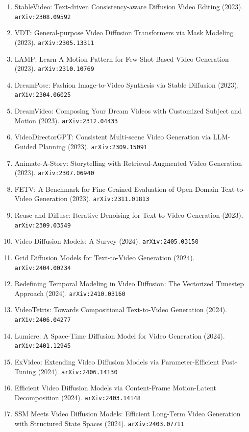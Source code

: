 \documentclass[11pt]{article}
\begin{document}
\begin{enumerate}
  Diffusion Model (2023). \texttt{arXiv:2311.16498}
  \item StableVideo: Text-driven Consistency-aware Diffusion Video Editing (2023). \texttt{arXiv:2308.09592}
  \item VDT: General-purpose Video Diffusion Transformers via Mask Modeling (2023). \texttt{arXiv:2305.13311}
  \item LAMP: Learn A Motion Pattern for Few-Shot-Based Video Generation (2023). \texttt{arXiv:2310.10769}
  \item DreamPose: Fashion Image-to-Video Synthesis via Stable Diffusion (2023). \texttt{arXiv:2304.06025}
  \item DreamVideo: Composing Your Dream Videos with Customized Subject and
  Motion (2023). \texttt{arXiv:2312.04433}
  \item VideoDirectorGPT: Consistent Multi-scene Video Generation via LLM-Guided
  Planning (2023). \texttt{arXiv:2309.15091}
  \item Animate-A-Story: Storytelling with Retrieval-Augmented Video Generation (2023). \texttt{arXiv:2307.06940}
  \item FETV: A Benchmark for Fine-Grained Evaluation of Open-Domain
  Text-to-Video Generation (2023). \texttt{arXiv:2311.01813}
  \item Reuse and Diffuse: Iterative Denoising for Text-to-Video Generation (2023). \texttt{arXiv:2309.03549}
  \item Video Diffusion Models: A Survey (2024). \texttt{arXiv:2405.03150}
  \item Grid Diffusion Models for Text-to-Video Generation (2024). \texttt{arXiv:2404.00234}
  \item Redefining Temporal Modeling in Video Diffusion: The Vectorized Timestep
  Approach (2024). \texttt{arXiv:2410.03160}
  \item VideoTetris: Towards Compositional Text-to-Video Generation (2024). \texttt{arXiv:2406.04277}
  \item Lumiere: A Space-Time Diffusion Model for Video Generation (2024). \texttt{arXiv:2401.12945}
  \item ExVideo: Extending Video Diffusion Models via Parameter-Efficient
  Post-Tuning (2024). \texttt{arXiv:2406.14130}
  \item Efficient Video Diffusion Models via Content-Frame Motion-Latent
  Decomposition (2024). \texttt{arXiv:2403.14148}
  \item SSM Meets Video Diffusion Models: Efficient Long-Term Video Generation
  with Structured State Spaces (2024). \texttt{arXiv:2403.07711}

\end{enumerate}
\end{document}
